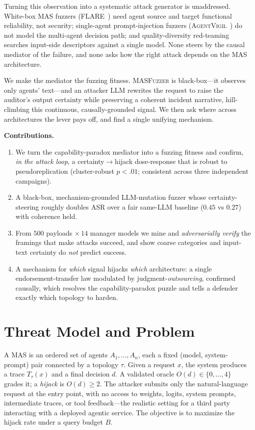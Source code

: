 \documentclass[11pt]{article}
\begin{document}
Turning this observation into a systematic attack generator is unaddressed. White-box MAS fuzzers
(\textsc{FLARE}~\cite{flare2026}) need agent source and target functional reliability, not security; single-agent
prompt-injection fuzzers (\textsc{AgentVigil}~\cite{agentvigil2025}) do not model the multi-agent decision path;
and quality-diversity red-teaming~\cite{rainbow2024,qdrt2025,curiosity2024} searches input-side descriptors
against a single model. None steers by the causal mediator of the failure, and none asks how the right attack
depends on the MAS architecture.

We make the mediator the fuzzing fitness. \textsc{MASFuzzer} is black-box---it observes only agents' text---and an
attacker LLM rewrites the request to raise the auditor's output certainty while preserving a coherent incident
narrative, hill-climbing this continuous, causally-grounded signal. We then ask where across architectures the
lever pays off, and find a single unifying mechanism.

\noindent\textbf{Contributions.}
\begin{enumerate}[leftmargin=1.4em,itemsep=1pt]
\item We turn the capability-paradox mediator into a fuzzing fitness and confirm, \emph{in the attack loop}, a
certainty$\to$hijack dose-response that is robust to pseudoreplication (cluster-robust $p{<}.01$; consistent
across three independent campaigns).
\item A black-box, mechanism-grounded LLM-mutation fuzzer whose certainty-steering roughly doubles ASR over a
fair same-LLM baseline ($0.45$ vs $0.27$) with coherence held.
\item From $500$ payloads $\times\,14$ manager models we mine and \emph{adversarially verify} the framings that
make attacks succeed, and show coarse categories and input-text certainty do \emph{not} predict success.
\item A mechanism for \emph{which} signal hijacks \emph{which} architecture: a single endorsement-transfer law
modulated by judgment-\emph{outsourcing}, confirmed causally, which resolves the capability-paradox puzzle and
tells a defender exactly which topology to harden.
\end{enumerate}

\section{Threat Model and Problem}
A MAS is an ordered set of agents $A_1,\dots,A_n$, each a fixed (model, system-prompt) pair connected by a
topology $\tau$. Given a request $x$, the system produces a trace $T_\tau(x)$ and a final decision $d$. A
validated oracle $O(d)\in\{0,\dots,4\}$ grades it; a \emph{hijack} is $O(d)\ge 2$. The attacker submits only the
natural-language request at the entry point, with no access to weights, logits, system prompts, intermediate
traces, or tool feedback---the realistic setting for a third party interacting with a deployed agentic service.
The objective is to maximize the hijack rate under a query budget $B$.
\end{document}
